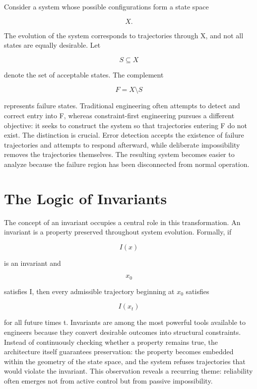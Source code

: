 \documentclass[11pt,oneside]{book}
\theoremstyle{plain}
\theoremstyle{definition}
\theoremstyle{remark}
\begin{document}
Consider a system whose possible configurations form a state space

\begin{equation}
X.
\end{equation}

The evolution of the system corresponds to trajectories through X, and not all states are equally desirable. Let

\begin{equation}
S
\subseteq
X
\end{equation}

denote the set of acceptable states. The complement

\begin{equation}
F
=
X
\setminus S
\end{equation}

represents failure states. Traditional engineering often attempts to detect and correct entry into F, whereas constraint-first engineering pursues a different objective: it seeks to construct the system so that trajectories entering F do not exist. The distinction is crucial. Error detection accepts the existence of failure trajectories and attempts to respond afterward, while deliberate impossibility removes the trajectories themselves. The resulting system becomes easier to analyze because the failure region has been disconnected from normal operation.

\section{The Logic of Invariants}

The concept of an invariant occupies a central role in this transformation. An invariant is a property preserved throughout system evolution. Formally, if

\begin{equation}
I(x)
\end{equation}

is an invariant and

\begin{equation}
x_0
\end{equation}

satisfies I, then every admissible trajectory beginning at \(x_0\) satisfies

\begin{equation}
I(x_t)
\end{equation}

for all future times t. Invariants are among the most powerful tools available to engineers because they convert desirable outcomes into structural constraints. Instead of continuously checking whether a property remains true, the architecture itself guarantees preservation: the property becomes embedded within the geometry of the state space, and the system refuses trajectories that would violate the invariant. This observation reveals a recurring theme: reliability often emerges not from active control but from passive impossibility.
\end{document}
